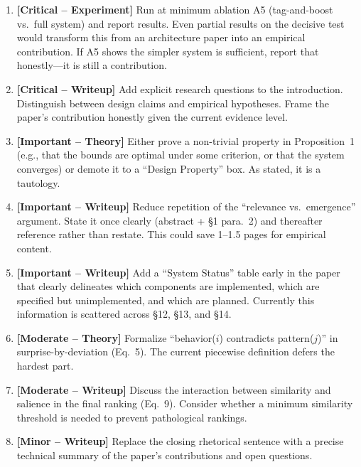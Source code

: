 \documentclass[11pt,a4paper]{article}
\begin{document}
\begin{enumerate}[label=\textbf{M\arabic*.}, leftmargin=2cm]

\item \textbf{[Critical -- Experiment]} Run at minimum ablation A5 (tag-and-boost vs.\ full system) and report results. Even partial results on the decisive test would transform this from an architecture paper into an empirical contribution. If A5 shows the simpler system is sufficient, report that honestly---it is still a contribution.

\item \textbf{[Critical -- Writeup]} Add explicit research questions to the introduction. Distinguish between design claims and empirical hypotheses. Frame the paper's contribution honestly given the current evidence level.

\item \textbf{[Important -- Theory]} Either prove a non-trivial property in Proposition~1 (e.g., that the bounds are optimal under some criterion, or that the system converges) or demote it to a ``Design Property'' box. As stated, it is a tautology.

\item \textbf{[Important -- Writeup]} Reduce repetition of the ``relevance vs.\ emergence'' argument. State it once clearly (abstract + \S1 para.~2) and thereafter reference rather than restate. This could save 1--1.5 pages for empirical content.

\item \textbf{[Important -- Writeup]} Add a ``System Status'' table early in the paper that clearly delineates which components are implemented, which are specified but unimplemented, and which are planned. Currently this information is scattered across \S12, \S13, and \S14.

\item \textbf{[Moderate -- Theory]} Formalize ``behavior($i$) contradicts pattern($j$)'' in surprise-by-deviation (Eq.~5). The current piecewise definition defers the hardest part.

\item \textbf{[Moderate -- Writeup]} Discuss the interaction between similarity and salience in the final ranking (Eq.~9). Consider whether a minimum similarity threshold is needed to prevent pathological rankings.

\item \textbf{[Minor -- Writeup]} Replace the closing rhetorical sentence with a precise technical summary of the paper's contributions and open questions.

\end{enumerate}
\end{document}
